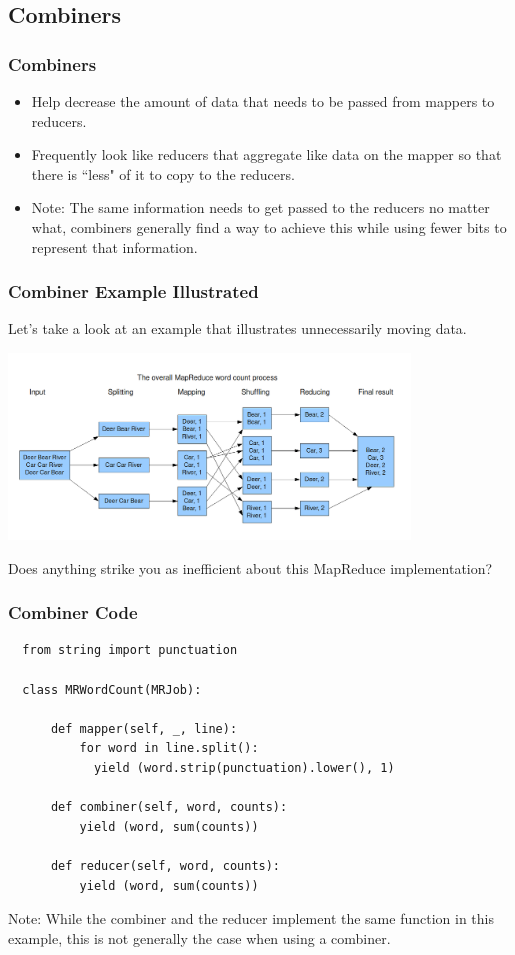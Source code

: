 \documentclass{beamer}
\begin{document}
\subsection{Combiners}
\begin{frame}
  \frametitle{Combiners}
  \begin{itemize}
    \item Help decrease the amount of data that needs to be passed from mappers to reducers.
    \item Frequently look like reducers that aggregate like data on the mapper so that there is ``less" of it to copy to the reducers.
    \item \alert{Note}: The same information needs to get passed to the reducers no matter what, combiners generally find a way to achieve this while using fewer bits to represent that information.
  \end{itemize}
\end{frame}

\begin{frame}
  \frametitle{Combiner Example Illustrated}
  Let's take a look at an example that illustrates unnecessarily moving data. \pause
  \begin{center}
    \includegraphics[width=0.8\textwidth]{../images/word_count.png} \pause
  \end{center}
  Does anything strike you as inefficient about this MapReduce implementation?
\end{frame}

\begin{frame}[fragile]
  \frametitle{Combiner Code}
  \begin{lstlisting}
  from string import punctuation

  class MRWordCount(MRJob):
    
      def mapper(self, _, line):
          for word in line.split():
            yield (word.strip(punctuation).lower(), 1)

      def combiner(self, word, counts):
          yield (word, sum(counts))

      def reducer(self, word, counts):
          yield (word, sum(counts))
  \end{lstlisting}
  \alert{Note}: While the combiner and the reducer implement the same function in this example, this is not generally the case when using a combiner.
\end{frame}
\end{document}
